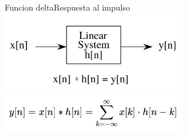 \begin{frame}{Funcion delta}{Respuesta al impulso}
   \centering\includegraphics[width=0.6\textwidth]{4_clase/entrada_conv_h}\\
   \centering\includegraphics[width=0.6\textwidth]{4_clase/convolucion_eq}
   \vfill
\end{frame}
